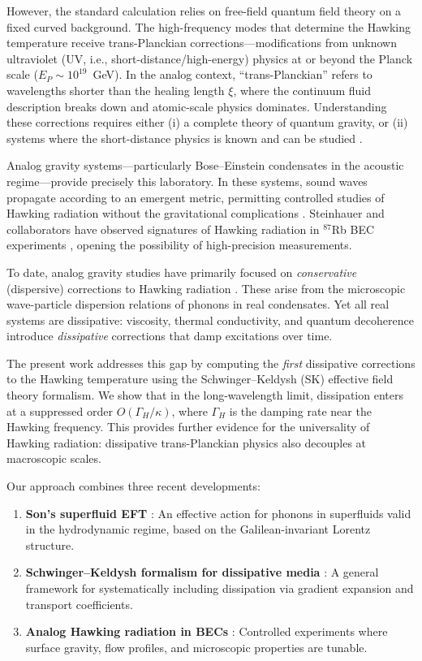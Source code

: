 \documentclass[aps,prl,twocolumn,superscriptaddress,nofootinbib,amsmath,amssymb]{revtex4-2}
\begin{document}
However, the standard calculation relies on free-field quantum field theory on a fixed curved background. The high-frequency modes that determine the Hawking temperature receive trans-Planckian corrections---modifications from unknown ultraviolet (UV, i.e., short-distance/high-energy) physics at or beyond the Planck scale ($E_P \sim 10^{19}$~GeV). In the analog context, ``trans-Planckian'' refers to wavelengths shorter than the healing length $\xi$, where the continuum fluid description breaks down and atomic-scale physics dominates. Understanding these corrections requires either (i) a complete theory of quantum gravity, or (ii) systems where the short-distance physics is known and can be studied \cite{Corley:1996,Jacobson:1996}.

Analog gravity systems---particularly Bose--Einstein condensates in the acoustic regime---provide precisely this laboratory. In these systems, sound waves propagate according to an emergent metric, permitting controlled studies of Hawking radiation without the gravitational complications \cite{Unruh:1981}. Steinhauer and collaborators have observed signatures of Hawking radiation in $^{87}$Rb BEC experiments \cite{Steinhauer:2019}, opening the possibility of high-precision measurements.

To date, analog gravity studies have primarily focused on \textit{conservative} (dispersive) corrections to Hawking radiation \cite{Coutant:2014,Berti:2025}. These arise from the microscopic wave-particle dispersion relations of phonons in real condensates. Yet all real systems are dissipative: viscosity, thermal conductivity, and quantum decoherence introduce \textit{dissipative} corrections that damp excitations over time.

The present work addresses this gap by computing the \textit{first} dissipative corrections to the Hawking temperature using the Schwinger--Keldysh (SK) effective field theory formalism. We show that in the long-wavelength limit, dissipation enters at a suppressed order $O(\Gamma_H / \kappa)$, where $\Gamma_H$ is the damping rate near the Hawking frequency. This provides further evidence for the universality of Hawking radiation: dissipative trans-Planckian physics also decouples at macroscopic scales.

Our approach combines three recent developments:
\begin{enumerate}
\item \textbf{Son's superfluid EFT} \cite{Son:2002}: An effective action for phonons in superfluids valid in the hydrodynamic regime, based on the Galilean-invariant Lorentz structure.
\item \textbf{Schwinger--Keldysh formalism for dissipative media} \cite{Crossley:2017,Jana:2020}: A general framework for systematically including dissipation via gradient expansion and transport coefficients.
\item \textbf{Analog Hawking radiation in BECs} \cite{Coutant:2014,Steinhauer:2019}: Controlled experiments where surface gravity, flow profiles, and microscopic properties are tunable.
\end{enumerate}
\end{document}
